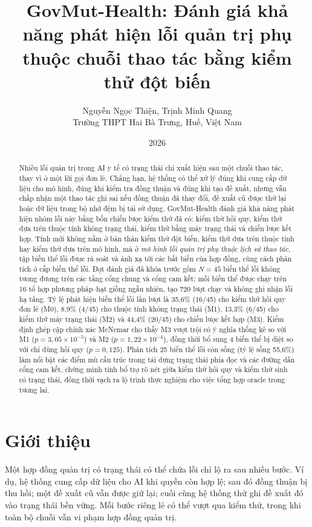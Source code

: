\documentclass[11pt]{article}
\title{\textbf{GovMut-Health: Đánh giá khả năng phát hiện lỗi quản trị phụ thuộc chuỗi thao tác bằng kiểm thử đột biến}}
\author{Nguyễn Ngọc Thiện, Trịnh Minh Quang \\ Trường THPT Hai Bà Trưng, Huế, Việt Nam}
\date{2026}
\begin{document}
\maketitle
\begin{abstract}
Nhiều lỗi quản trị trong AI y tế có trạng thái chỉ xuất hiện sau một chuỗi thao tác, thay vì ở một lời gọi đơn lẻ. Chẳng hạn, hệ thống có thể xử lý đúng khi cung cấp dữ liệu cho mô hình, đúng khi kiểm tra đồng thuận và đúng khi tạo đề xuất, nhưng vẫn chấp nhận một thao tác ghi sai nếu đồng thuận đã thay đổi, đề xuất cũ được thử lại hoặc dữ liệu trong bộ nhớ đệm bị tái sử dụng. GovMut-Health đánh giá khả năng phát hiện nhóm lỗi này bằng bốn chiến lược kiểm thử đã có: kiểm thử hồi quy, kiểm thử dựa trên thuộc tính không trạng thái, kiểm thử bằng máy trạng thái và chiến lược kết hợp. Tính mới không nằm ở bản thân kiểm thử đột biến, kiểm thử dựa trên thuộc tính hay kiểm thử dựa trên mô hình, mà ở \emph{mô hình lỗi quản trị phụ thuộc lịch sử thao tác}, tập biến thể lỗi được rà soát và ánh xạ tới các bất biến của hợp đồng, cùng cách phân tích ở cấp biến thể lỗi. Đợt đánh giá đã khóa trước gồm $N=45$ biến thể lỗi không tương đương trên các tầng cổng chung và cổng cam kết; mỗi biến thể được chạy trên 16 tổ hợp phương pháp--hạt giống ngẫu nhiên, tạo 720 lượt chạy và không ghi nhận lỗi hạ tầng. Tỷ lệ phát hiện biến thể lỗi lần lượt là 35,6\% (16/45) cho kiểm thử hồi quy đơn lẻ (M0), 8,9\% (4/45) cho thuộc tính không trạng thái (M1), 13,3\% (6/45) cho kiểm thử máy trạng thái (M2) và 44,4\% (20/45) cho chiến lược kết hợp (M3). Kiểm định ghép cặp chính xác McNemar cho thấy M3 vượt trội có ý nghĩa thống kê so với M1 ($p = 3{,}05 \times 10^{-5}$) và M2 ($p = 1{,}22 \times 10^{-4}$), đồng thời bổ sung 4 biến thể bị diệt so với chỉ dùng hồi quy ($p = 0{,}125$). Phân tích 25 biến thể lỗi còn sống (tỷ lệ sống 55,6\%) làm nổi bật các điểm mù cấu trúc trong tái dựng trạng thái phía đọc và các đường dẫn cổng cam kết, chứng minh tính bổ trợ rõ nét giữa kiểm thử hồi quy và kiểm thử sinh có trạng thái, đồng thời vạch ra lộ trình thực nghiệm cho việc tổng hợp oracle trong tương lai.
\end{abstract}

\section{Giới thiệu}
Một hợp đồng quản trị có trạng thái có thể chứa lỗi chỉ lộ ra sau nhiều bước. Ví dụ, hệ thống cung cấp dữ liệu cho AI khi quyền còn hợp lệ; sau đó đồng thuận bị thu hồi; một đề xuất cũ vẫn được giữ lại; cuối cùng hệ thống thử ghi đề xuất đó vào trạng thái bền vững. Mỗi bước riêng lẻ có thể vượt qua kiểm thử, trong khi toàn bộ chuỗi vẫn vi phạm hợp đồng quản trị.
\end{document}
